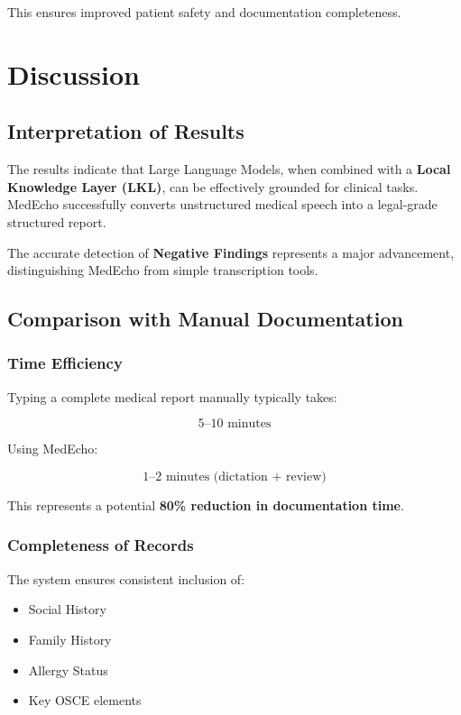 This ensures improved patient safety and documentation completeness.

\section{Discussion}

\subsection{Interpretation of Results}
The results indicate that Large Language Models, when combined with a 
\textbf{Local Knowledge Layer (LKL)}, can be effectively grounded for clinical tasks.  
MedEcho successfully converts unstructured medical speech into a legal-grade structured 
report.

The accurate detection of \textbf{Negative Findings} represents a major advancement, 
distinguishing MedEcho from simple transcription tools.

\subsection{Comparison with Manual Documentation}
\label{sec:results:comparison}

\subsubsection*{Time Efficiency}
Typing a complete medical report manually typically takes:

\[
5\text{–}10 \text{ minutes}
\]

Using MedEcho:

\[
1\text{–}2 \text{ minutes (dictation + review)}
\]

This represents a potential \textbf{80\% reduction in documentation time}.

\subsubsection*{Completeness of Records}
The system ensures consistent inclusion of:

\begin{itemize}
    \item Social History
    \item Family History
    \item Allergy Status
    \item Key OSCE elements
\end{itemize}

